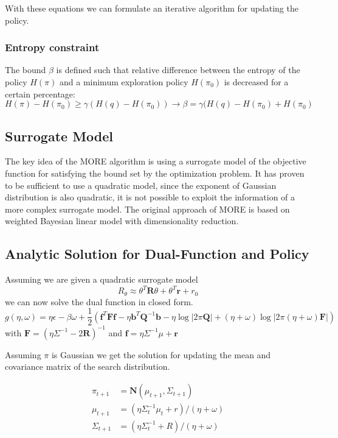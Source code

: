 With these equations we can formulate an iterative algorithm for updating the
policy.

\subsubsection{Entropy constraint}
The bound $\beta$ is defined such that relative difference between the entropy
of the policy $H(\pi)$ and a minimum exploration policy $H(\pi_0)$ is
decreased
for a certain percentage:
$$ H(\pi) - H(\pi_0) \geq \gamma (H(q) - H(\pi_0))
\rightarrow \beta = \gamma (H(q) - H(\pi_0) + H(\pi_0) $$

\subsection{Surrogate Model}
The key idea of the MORE algorithm is using a surrogate model
of the objective function
for satisfying the bound set by the optimization problem. It has proven to be
sufficient to use a quadratic model, since the exponent
of Gaussian distribution
is also quadratic, it is not possible to exploit the information of a more
complex surrogate model.
The original approach of MORE is based on weighted Bayesian linear model with
dimensionality reduction.

\subsection{Analytic Solution for Dual-Function and Policy}
Assuming we are given a quadratic surrogate model
$$ R_\theta \approx \theta^T \mathbf{R} \theta + \theta^T \mathbf{r} + r_0 $$
we can now solve the dual function in closed form.
$$ g(\eta, \omega) = \eta \epsilon - \beta \omega
+ \frac{1}{2} \left(\mathbf{f}^T \mathbf{F} \mathbf{f}
  - \eta \mathbf{b}^T \mathbf{Q}^{-1}
  \mathbf{b} - \eta \log |2\pi \mathbf{Q}|
  + (\eta + \omega) \log |2\pi (\eta + \omega)
\mathbf{F}| \right) $$
with $\mathbf{F} = (\eta \Sigma^{-1} - 2 \mathbf{R})^{-1}$ and
$\mathbf{f} = \eta \Sigma^{-1} \mu + \mathbf{r}$

Assuming $\pi$ is Gaussian we get the solution 
for updating the mean and covariance matrix
of the search distribution.

\begin{equation}
  \label{policy_update}
  \begin{aligned}
    \pi_{t+1} &= \mathbf{N}(\mu_{t+1}, \Sigma_{t+1}) \\
    \mu_{t+1} &= (\eta \Sigma_{t}^{-1}\mu_t + r) / (\eta + \omega) \\
    \Sigma_{t+1} &= (\eta \Sigma_t^{-1} + R) / (\eta + \omega)
  \end{aligned}
\end{equation}

